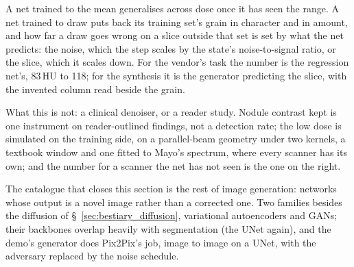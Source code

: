 \medskip\noindent A net trained to the mean generalises across dose once
it has seen the range. A net trained to draw puts back its training set's
grain in character and in
amount, and how far a draw goes wrong on a slice outside that set is set
by what the net predicts: the noise, which the step scales by the state's
noise-to-signal ratio, or the slice, which it scales down. For the
vendor's task the number is the regression net's, 83\,HU to 118; for the
synthesis it is the generator predicting the slice, with the invented
column read beside the grain.

\medskip\noindent What this is not: a clinical denoiser, or a reader study.
Nodule contrast kept is one instrument on reader-outlined findings, not a
detection rate; the low dose is simulated on the training side, on a
parallel-beam geometry under two kernels, a textbook window and one
fitted to Mayo's spectrum, where every scanner has its own;
and the number for a scanner the net has not seen is the one on the
right.

\medskip\noindent The catalogue that closes this section is the rest of
image generation: networks whose output is a novel image rather than a
corrected one. Two families besides the diffusion of
\S~\ref{sec:bestiary_diffusion}, variational autoencoders and GANs; their
backbones overlap heavily with segmentation (the UNet again), and the demo's
generator does Pix2Pix's job, image to image on a UNet, with the adversary
replaced by the noise schedule.

